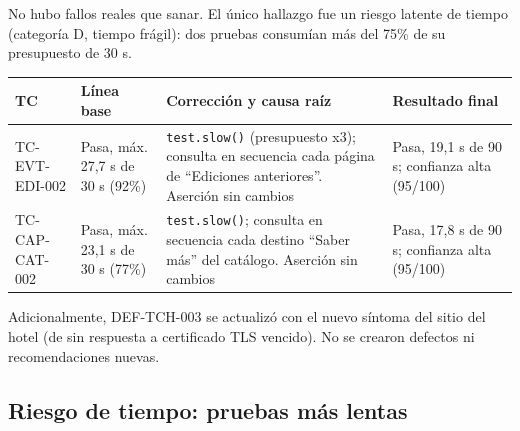 \documentclass[11pt,a4paper]{article}
\newcommand{\code}[1]{\texttt{#1}}
\begin{document}
No hubo fallos reales que sanar. El único hallazgo fue un riesgo latente de tiempo (categoría D, tiempo frágil): dos pruebas consumían más del 75\% de su presupuesto de 30 s.

\begin{center}\small
\begin{tabularx}{\textwidth}{@{}l >{\raggedright\arraybackslash}p{} >{\raggedright\arraybackslash}X >{\raggedright\arraybackslash}p{}@{}}
\toprule
TC & Línea base & Corrección y causa raíz & Resultado final \\
\midrule
TC-EVT-EDI-002 & Pasa, máx. 27,7 s de 30 s (92\%) & \code{test.slow()} (presupuesto x3); consulta en secuencia cada página de ``Ediciones anteriores''. Aserción sin cambios & Pasa, 19,1 s de 90 s; confianza alta (95/100) \\
\addlinespace
TC-CAP-CAT-002 & Pasa, máx. 23,1 s de 30 s (77\%) & \code{test.slow()}; consulta en secuencia cada destino ``Saber más'' del catálogo. Aserción sin cambios & Pasa, 17,8 s de 90 s; confianza alta (95/100) \\
\bottomrule
\end{tabularx}
\end{center}

Adicionalmente, DEF-TCH-003 se actualizó con el nuevo síntoma del sitio del hotel (de sin respuesta a certificado TLS vencido). No se crearon defectos ni recomendaciones nuevas.

\subsection{Riesgo de tiempo: pruebas más lentas}
\end{document}
